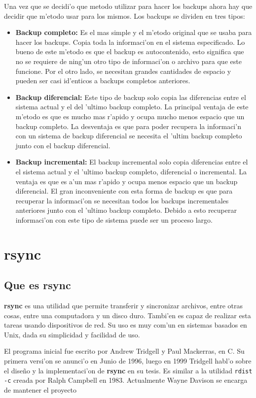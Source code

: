 \documentclass[11pt]{article}
\newcommand{\rsync}[0]{\textbf{rsync }}
\begin{document}
		Una vez que se decidi'o que metodo utilizar para hacer los backups ahora hay que decidir que m'etodo usar para los mismos. Los backups se dividen en tres tipos:
		\begin{itemize}
			\item \textbf{Backup completo: } Es el mas simple y el m'etodo original que se usaba para hacer los backups. Copia toda la informaci'on en el sistema especificado. Lo bueno de este m'etodo es que el backup es autocontenido, esto significa que no se requiere de ning'un otro tipo de informaci'on o archivo para que este funcione. Por el otro lado, se necesitan grandes cantidades de espacio y pueden ser casi id'enticos a backups completos anteriores.
			\item \textbf{Backup diferencial: } Este tipo de backup solo copia las diferencias entre el sistema actual y el del 'ultimo backup completo. La principal ventaja de este m'etodo es que es mucho mas r'apido y ocupa mucho menos espacio que un backup completo. La desventaja es que para poder recupera la informaci'n con un sistema de backup diferencial se necesita el 'ultim backup completo junto con el backup diferencial.
			\item \textbf{Backup incremental: }El backup incremental solo copia diferencias entre el el sistema actual y el 'ultimo backup completo, diferencial o incremental. La ventaja es que es a'un mas r'apido y ocupa menos espacio que un backup diferencial. El gran inconveniente con esta forma de backup es que para recuperar la informaci'on se necesitan todos los backups incrementales anteriores junto con el 'ultimo backup completo. Debido a esto recuperar informaci'on con este tipo de sistema puede ser un proceso largo.
		\end{itemize}


	\section{rsync}
	\subsection{Que es rsync}
		\rsync es una utilidad que permite transferir y sincronizar archivos, entre otras cosas, entre una computadora y un disco duro. Tambi'en es capaz de realizar esta tareas usando dispositivos de red. Su uso es muy com'un en sistemas basados en Unix, dada su simplicidad y facilidad de uso.

		El programa inicial fue escrito por Andrew Tridgell y Paul Mackerras, en C. Su primera versi'on se anunci'o en Junio de 1996, luego en 1999 Tridgell habl'o sobre el diseño y la implementaci'on de \rsync en su tesis. Es similar a la utilidad \texttt{rdist -c} creada por Ralph Campbell en 1983. Actualmente Wayne Davison se encarga de mantener el proyecto
\end{document}
